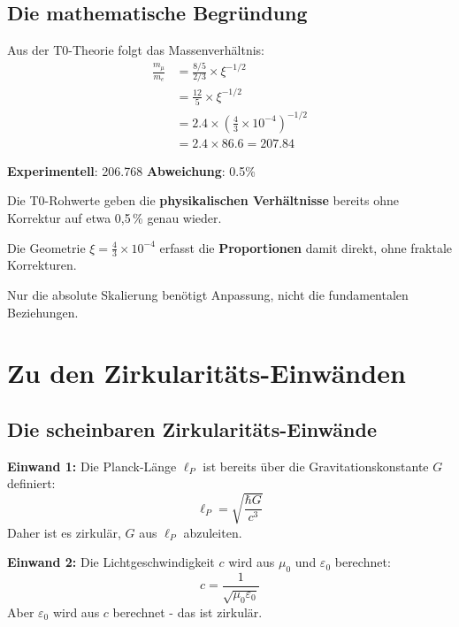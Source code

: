 	\subsection{Die mathematische Begründung}
	
	Aus der T0-Theorie folgt das Massenverhältnis:
	\begin{align}
		\frac{m_\mu}{m_e} &= \frac{8/5}{2/3} \times \xi^{-1/2} \\
		&= \frac{12}{5} \times \xi^{-1/2} \\
		&= 2.4 \times \left(\frac{4}{3} \times 10^{-4}\right)^{-1/2} \\
		&= 2.4 \times 86.6 = 207.84
	\end{align}
	
	\textbf{Experimentell}: 206.768 \quad \textbf{Abweichung}: 0.5\%
	
	\begin{tcolorbox}[colback=green!5!white,colframe=green!75!black,title=Schlussfolgerung]
		Die T0-Rohwerte geben die \textbf{physikalischen Verhältnisse} bereits ohne Korrektur auf etwa 0,5\,\% genau wieder.
		
		Die Geometrie $\xi = \frac{4}{3} \times 10^{-4}$ erfasst die \textbf{Proportionen} damit direkt, ohne fraktale Korrekturen.
		
		Nur die absolute Skalierung benötigt Anpassung, nicht die fundamentalen Beziehungen.
	\end{tcolorbox}
	
	\section{Zu den Zirkularitäts-Einwänden}
	
	\subsection{Die scheinbaren Zirkularitäts-Einwände}
	
	\begin{tcolorbox}[colback=red!10!white,colframe=red!75!black,title=Häufige Kritikpunkte]
		\textbf{Einwand 1:} Die Planck-Länge $\ell_P$ ist bereits über die Gravitationskonstante $G$ definiert:
		\begin{equation}
			\ell_P = \sqrt{\frac{\hbar G}{c^3}}
		\end{equation}
		Daher ist es zirkulär, $G$ aus $\ell_P$ abzuleiten.
		
		\textbf{Einwand 2:} Die Lichtgeschwindigkeit $c$ wird aus $\mu_0$ und $\varepsilon_0$ berechnet:
		\begin{equation}
			c = \frac{1}{\sqrt{\mu_0 \varepsilon_0}}
		\end{equation}
		Aber $\varepsilon_0$ wird aus $c$ berechnet - das ist zirkulär.
	\end{tcolorbox}
	
